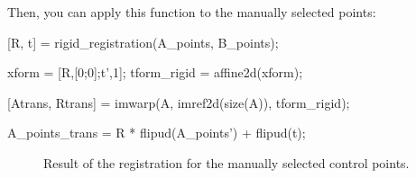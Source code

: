 Then, you can apply this function to the manually selected points:
\begin{matlab}
[R, t] = rigid_registration(A_points, B_points);

xform = [R,[0;0];t',1];
tform_rigid = affine2d(xform);


[Atrans, Rtrans] = imwarp(A, imref2d(size(A)), tform_rigid);

A_points_trans = R * flipud(A_points') + flipud(t);
\end{matlab}

\begin{figure}[htbp]
\centering
 \hfill
 
 \caption{Result of the registration for the manually selected control points.}
 \label{fig:registration:matlab:reg}
\end{figure}

